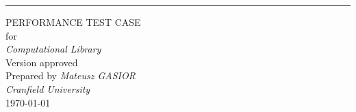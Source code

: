 \begin{flushright}
    \rule{16cm}{5pt}\vskip1cm
    \begin{bfseries}
        \Huge{PERFORMANCE TEST CASE}\\
        \vspace{1.9cm}
        for\\
        \vspace{1.9cm}
	    \textit{Computational Library}\\
        \vspace{1.9cm}
        \LARGE{Version \myversion approved}\\
        \vspace{1.9cm}
        Prepared by \textit{Mateusz GASIOR}\\
        \vspace{1.9cm}
        \textit{Cranfield University}\\
        \vspace{1.9cm}
        \today\\
    \end{bfseries}
\end{flushright}